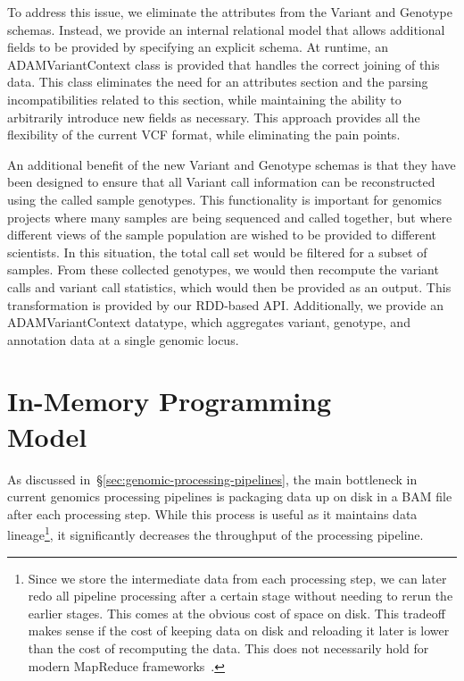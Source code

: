 \documentclass[10pt,twocolumn]{article}
\theoremstyle{plain}
\begin{document}
To address this issue, we eliminate the attributes from the Variant and Genotype schemas. Instead, we provide an internal relational model
that allows additional fields to be provided by specifying an explicit schema. At runtime, an ADAMVariantContext class is provided that
handles the correct joining of this data. This class eliminates the need for an attributes section and the parsing incompatibilities related to this section,
while maintaining the ability to arbitrarily introduce new fields as necessary. This approach provides all the flexibility of the current VCF format, while eliminating
the pain points.

An additional benefit of the new Variant and Genotype schemas is that they have been designed to ensure that all Variant call information
can be reconstructed using the called sample genotypes. This functionality is important for genomics projects where many samples are being
sequenced and called together, but where different views of the sample population are wished to be provided to different scientists. In this
situation, the total call set would be filtered for a subset of samples. From these collected genotypes, we would then recompute the variant
calls and variant call statistics, which would then be provided as an output. This transformation is provided by our RDD-based API. Additionally,
we provide an ADAMVariantContext datatype, which aggregates variant, genotype, and annotation data at a single genomic locus.

\section{In-Memory Programming\\Model}
\label{sec:in-memory-programming-model}

As discussed in~\S\ref{sec:genomic-processing-pipelines}, the main bottleneck in current genomics processing pipelines is
packaging data up on disk in a BAM file after each processing step. While this process is useful as it maintains data
lineage\footnote{Since we store the intermediate data from each processing step, we can later redo all pipeline processing
after a certain stage without needing to rerun the earlier stages. This comes at the obvious cost of space on disk. This tradeoff
makes sense if the cost of keeping data on disk and reloading it later is lower than the cost of recomputing the data. This
does not necessarily hold for modern MapReduce frameworks~\cite{zaharia12}.}, it significantly decreases the throughput of the
processing pipeline.
\end{document}
